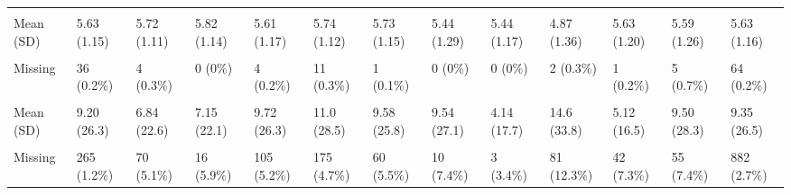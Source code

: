 \documentclass[
  single column]{article}
\begin{document}
\begin{landscape}
\begin{longtable}[t]{lllllllllllll}
\cellcolor{gray!10}{Honesty-Humility (Personality Trait)} & \cellcolor{gray!10}{} & \cellcolor{gray!10}{} & \cellcolor{gray!10}{} & \cellcolor{gray!10}{} & \cellcolor{gray!10}{} & \cellcolor{gray!10}{} & \cellcolor{gray!10}{} & \cellcolor{gray!10}{} & \cellcolor{gray!10}{} & \cellcolor{gray!10}{} & \cellcolor{gray!10}{} & \cellcolor{gray!10}{}\\
\addlinespace
Mean (SD) & 5.63 (1.15) & 5.72 (1.11) & 5.82 (1.14) & 5.61 (1.17) & 5.74 (1.12) & 5.73 (1.15) & 5.44 (1.29) & 5.44 (1.17) & 4.87 (1.36) & 5.63 (1.20) & 5.59 (1.26) & 5.63 (1.16)\\
\cellcolor{gray!10}{Median [Min, Max]} & \cellcolor{gray!10}{5.75 [1.00, 7.00]} & \cellcolor{gray!10}{6.00 [1.25, 7.00]} & \cellcolor{gray!10}{6.00 [2.00, 7.00]} & \cellcolor{gray!10}{5.75 [1.00, 7.00]} & \cellcolor{gray!10}{6.00 [1.00, 7.00]} & \cellcolor{gray!10}{6.00 [1.00, 7.00]} & \cellcolor{gray!10}{5.50 [1.50, 7.00]} & \cellcolor{gray!10}{5.67 [2.00, 7.00]} & \cellcolor{gray!10}{5.00 [1.00, 7.00]} & \cellcolor{gray!10}{6.00 [1.00, 7.00]} & \cellcolor{gray!10}{5.75 [1.00, 7.00]} & \cellcolor{gray!10}{5.75 [1.00, 7.00]}\\
Missing & 36 (0.2\%) & 4 (0.3\%) & 0 (0\%) & 4 (0.2\%) & 11 (0.3\%) & 1 (0.1\%) & 0 (0\%) & 0 (0\%) & 2 (0.3\%) & 1 (0.2\%) & 5 (0.7\%) & 64 (0.2\%)\\
\cellcolor{gray!10}{Hours Spent with Children per Week} & \cellcolor{gray!10}{} & \cellcolor{gray!10}{} & \cellcolor{gray!10}{} & \cellcolor{gray!10}{} & \cellcolor{gray!10}{} & \cellcolor{gray!10}{} & \cellcolor{gray!10}{} & \cellcolor{gray!10}{} & \cellcolor{gray!10}{} & \cellcolor{gray!10}{} & \cellcolor{gray!10}{} & \cellcolor{gray!10}{}\\
Mean (SD) & 9.20 (26.3) & 6.84 (22.6) & 7.15 (22.1) & 9.72 (26.3) & 11.0 (28.5) & 9.58 (25.8) & 9.54 (27.1) & 4.14 (17.7) & 14.6 (33.8) & 5.12 (16.5) & 9.50 (28.3) & 9.35 (26.5)\\
\addlinespace
\cellcolor{gray!10}{Median [Min, Max]} & \cellcolor{gray!10}{0 [0, 168]} & \cellcolor{gray!10}{0 [0, 168]} & \cellcolor{gray!10}{0 [0, 168]} & \cellcolor{gray!10}{0 [0, 168]} & \cellcolor{gray!10}{0 [0, 168]} & \cellcolor{gray!10}{0 [0, 168]} & \cellcolor{gray!10}{0 [0, 168]} & \cellcolor{gray!10}{0 [0, 150]} & \cellcolor{gray!10}{0 [0, 168]} & \cellcolor{gray!10}{0 [0, 168]} & \cellcolor{gray!10}{0 [0, 168]} & \cellcolor{gray!10}{0 [0, 168]}\\
Missing & 265 (1.2\%) & 70 (5.1\%) & 16 (5.9\%) & 105 (5.2\%) & 175 (4.7\%) & 60 (5.5\%) & 10 (7.4\%) & 3 (3.4\%) & 81 (12.3\%) & 42 (7.3\%) & 55 (7.4\%) & 882 (2.7\%)\\

\end{longtable}
\end{landscape}
\end{document}
